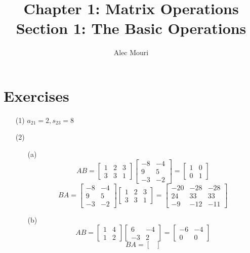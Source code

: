\documentclass[12pt]{article}
\begin{document}
\title{Chapter 1: Matrix Operations \\ Section 1: The Basic Operations}
\author{Alec Mouri}

\maketitle
\section*{Exercises}
\begin{itemize}
\item[(1)]
$a_{21} = 2, s_{23} = 8$
\item[(2)]
\begin{itemize}
\item[(a)]
$$AB = \begin{bmatrix}
1 & 2 & 3 \\
3 & 3 & 1
\end{bmatrix}\begin{bmatrix}
-8 & -4 \\
9 & 5 \\
-3 & -2
\end{bmatrix} = \begin{bmatrix}
1 & 0 \\
0 & 1
\end{bmatrix}$$
$$BA = \begin{bmatrix}
-8 & -4 \\
9 & 5 \\
-3 & -2
\end{bmatrix}\begin{bmatrix}
1 & 2 & 3 \\
3 & 3 & 1
\end{bmatrix} = \begin{bmatrix}
-20 & -28 & - 28 \\
24 & 33 & 33 \\
-9 & -12 & -11
\end{bmatrix}$$
\item[(b)]
$$AB = \begin{bmatrix}
1 & 4 \\
1 & 2
\end{bmatrix}\begin{bmatrix}
6 & -4 \\
-3 & 2
\end{bmatrix} = \begin{bmatrix}
-6 & -4 \\
0 & 0
\end{bmatrix}$$
$$BA = \begin{bmatrix}

\end{bmatrix}$$
\end{itemize}
\end{itemize}
\end{document}
